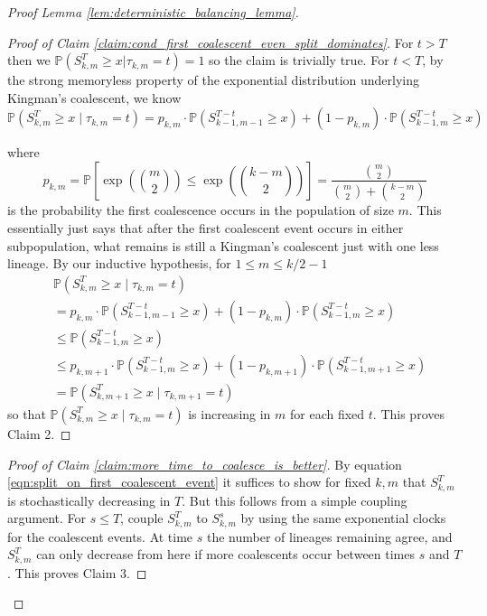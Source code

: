 \documentclass[10pt,oneside,reqno]{article}
\theoremstyle{plain}
\theoremstyle{definition}
\numberwithin{equation}{section}
\renewcommand{\leq}{\leqslant}
\renewcommand{\geq}{\geqslant}
\renewcommand{\P}{\mathbb{P}}
\begin{document}
\begin{proof}[Proof Lemma \ref{lem:deterministic_balancing_lemma}]
  \begin{proof}[Proof of Claim \ref{claim:cond_first_coalescent_even_split_dominates}]
      For $t > T$ then we $\P(S_{k,m}^T \geq x | \tau_{k,m} = t) = 1$ so the claim is trivially true. For $t < T$, by the strong memoryless property of the exponential distribution underlying Kingman's coalescent, we know
%
        \begin{equation}
            \P(S_{k,m}^T \geq x \; | \; \tau_{k,m} = t) = p_{k,m} \cdot \P(S_{k-1,m-1}^{T-t} \geq x) + (1-p_{k, m}) \cdot \P(S_{k-1,m}^{T-t} \geq x)
            \label{eqn:split_on_first_coalescent_event}
        \end{equation}
        
        \noindent where
        \[p_{k,m} = \P\left[\exp\left({m \choose 2}\right) \leq \exp\left({k-m \choose 2}\right)\right] = \frac{{m \choose 2}}{{m \choose 2} + {k-m \choose 2}}\]
        \noindent is the probability the first coalescence occurs in the population of size $m$. This essentially just says that after the first coalescent event occurs in either subpopulation, what remains is still a Kingman's coalescent just with one less lineage. By our inductive hypothesis, for $1 \leq m \leq k/2 - 1$
        \begin{align*}
             & \P(S_{k,m}^T \geq x \; | \; \tau_{k,m} = t)\\
             &  = p_{k,m} \cdot \P(S_{k-1,m-1}^{T-t} \geq x) + (1-p_{k, m}) \cdot \P(S_{k-1,m}^{T-t} \geq x) \\
            & \leq \P(S_{k-1,m}^{T-t} \geq x) \\ 
            & \leq  p_{k,m+1} \cdot \P(S_{k-1,m}^{T-t} \geq x) + (1-p_{k, m+1}) \cdot \P(S_{k-1,m+1}^{T-t} \geq x)\\
            & = \P(S_{k,m+1}^T \geq x \; | \; \tau_{k,m+1} = t)
        \end{align*}
        \noindent so that $\P(S_{k,m}^T \geq x \; | \; \tau_{k,m} = t)$ is increasing in $m$ for each fixed $t$. This proves Claim 2.
  \end{proof}


  \begin{proof}[Proof of Claim \ref{claim:more_time_to_coalesce_is_better}]
      By equation \eqref{eqn:split_on_first_coalescent_event} it suffices to show for fixed $k,m$ that $S^T_{k,m}$ is stochastically decreasing in $T$. But this follows from a simple coupling argument. For $s \leq T$, couple $S_{k,m}^T$ to $S_{k,m}^s$ by using the same exponential clocks for the coalescent events. At time $s$ the number of lineages remaining agree, and $S^T_{k,m}$ can only decrease from here if more coalescents occur between times $s$ and $T$. This proves Claim 3. 
  \end{proof}


\end{proof}
\end{document}

